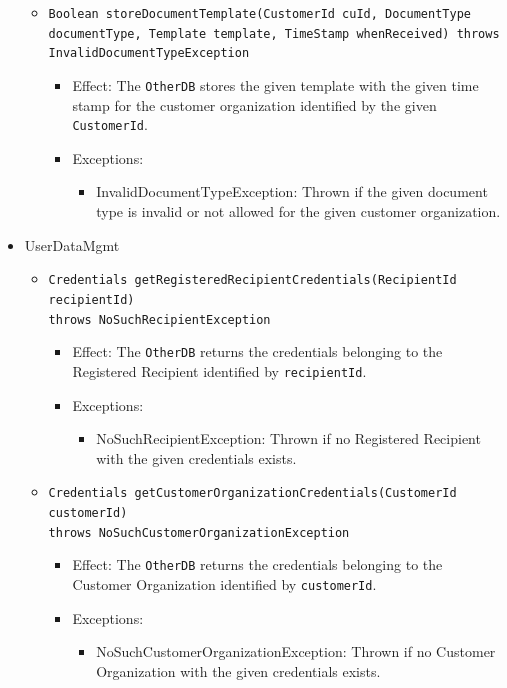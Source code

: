 \documentclass[a4paper,10pt]{article}
\begin{document}
\begin{itemize}
\begin{itemize}
   		\item \texttt{Boolean storeDocumentTemplate(CustomerId cuId, DocumentType documentType, Template template, TimeStamp whenReceived) throws InvalidDocumentTypeException}
        \begin{itemize}
            \item Effect: The \texttt{OtherDB} stores the given template with the given time stamp for the customer organization identified by the given \texttt{CustomerId}.
            \item Exceptions:
            \begin{itemize}
            	\item InvalidDocumentTypeException: Thrown if the given document type is invalid or not allowed for the given customer organization.
            \end{itemize}
        \end{itemize}          
    \end{itemize}
    
    \item UserDataMgmt
    \begin{itemize}
        \item \texttt{Credentials getRegisteredRecipientCredentials(RecipientId recipientId) \\throws NoSuchRecipientException}
        \begin{itemize}
            \item Effect: The \texttt{OtherDB} returns the credentials belonging to the Registered Recipient identified by \texttt{recipientId}.
            \item Exceptions:
            \begin{itemize}
                \item NoSuchRecipientException: Thrown if no Registered Recipient with the given credentials exists.
            \end{itemize}
		\end{itemize}
            
        \item \texttt{Credentials getCustomerOrganizationCredentials(CustomerId customerId) \\ throws NoSuchCustomerOrganizationException}
        \begin{itemize}
            \item Effect: The \texttt{OtherDB} returns the credentials belonging to the Customer Organization identified by \texttt{customerId}.
            \item Exceptions:
            \begin{itemize}
                \item NoSuchCustomerOrganizationException: Thrown if no Customer Organization with the given credentials exists.
            \end{itemize}
        \end{itemize}
        

\end{itemize}
\end{itemize}
\end{document}
